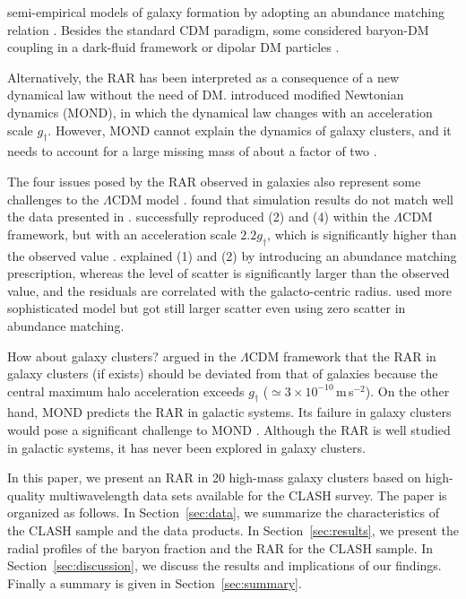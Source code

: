 \documentclass[a4paper,iop,twocolumn,twocolappendix,numberedappendix,appendixfloats]{emulateapj}
\begin{document}
    semi-empirical models of galaxy formation \citep{DL16, Navarro17, Desmond17}
    by adopting an abundance matching relation \citep{Behroozi13}.
    Besides the standard CDM paradigm,
    some considered baryon-DM coupling in a dark-fluid framework \citep{ZL10,
    Khoury15} or dipolar DM particles \citep{BL08, BL09}.

    Alternatively, the RAR has been interpreted as a consequence of a
    new dynamical law without the need of DM.
    \cite{Milgrom83} introduced modified Newtonian dynamics (MOND),
    in which the dynamical law changes with an acceleration scale $g_{\dag}$.
    However, MOND cannot explain the dynamics of galaxy clusters, and it
    needs to account for a large missing mass of about a factor of two \citep{PS05, Sanders99, Sanders03}.


    The four issues posed by the RAR observed in galaxies also
    represent some challenges to the ${\Lambda}$CDM model
    \citep{Desmond17, Lelli17}.
    \citet{WK15} found that simulation results do not match well the
    data presented in  \cite{McGaugh04}.
    \citet{Ludlow17} successfully reproduced (2) and (4) within the
    $\Lambda$CDM framework, but with an acceleration scale $2.2g_{\dag}$,
    which is significantly higher than the observed value \citep{Li18}.
    \citet{DL16} explained (1) and (2) by introducing an abundance matching prescription,
    whereas the level of scatter is significantly larger than the
    observed value, and the residuals are correlated with the
    galacto-centric radius.
    \citet{Desmond17} used more sophisticated model but got still larger
    scatter even using zero scatter in abundance matching.

    How about galaxy clusters? \citet{Navarro17} argued in the
    $\Lambda$CDM framework that
    the RAR in galaxy clusters (if exists) should be deviated
    from that of galaxies because the
    central maximum halo acceleration exceeds $g_{\dag}$
    ($\simeq3\times10^{-10}$\,m\,s$^{-2}$).
    On the other hand, MOND predicts the RAR in galactic systems.
    Its failure in galaxy clusters would pose a significant challenge to
    MOND \citep{FM12}.
    Although the RAR is well studied in galactic systems, it
    has never been explored in galaxy clusters.

In this paper, we present an RAR in 20 high-mass galaxy clusters based on
high-quality multiwavelength data sets available for the CLASH survey.
The paper is organized as follows.
In Section~\ref{sec:data}, we summarize the characteristics of the CLASH
sample and the data products.
In Section~\ref{sec:results}, we present the radial profiles of the
baryon fraction and the RAR for the CLASH sample.
In Section~\ref{sec:discussion}, we discuss the results and implications of our findings.
Finally a summary is given in Section~\ref{sec:summary}.
\end{document}
